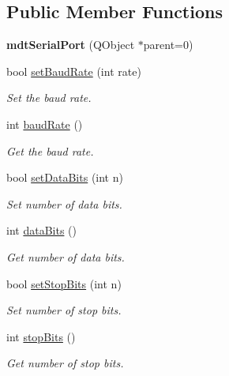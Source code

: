 \subsection*{Public Member Functions}
\begin{DoxyCompactItemize}
\item 
\hypertarget{classmdt_serial_port_a7b2da083885e727981c1fd4414634cae}{
{\bfseries mdtSerialPort} (QObject $\ast$parent=0)}
\label{classmdt_serial_port_a7b2da083885e727981c1fd4414634cae}

\item 
bool \hyperlink{classmdt_serial_port_ad77b6a5fd819fae6db0db888b3113351}{setBaudRate} (int rate)
\begin{DoxyCompactList}\small\item\em Set the baud rate. \end{DoxyCompactList}\item 
int \hyperlink{classmdt_serial_port_ab7d9433433f4ec5d5e584721e5bb1195}{baudRate} ()
\begin{DoxyCompactList}\small\item\em Get the baud rate. \end{DoxyCompactList}\item 
bool \hyperlink{classmdt_serial_port_af39774b2d3c4121623253740660a0389}{setDataBits} (int n)
\begin{DoxyCompactList}\small\item\em Set number of data bits. \end{DoxyCompactList}\item 
int \hyperlink{classmdt_serial_port_a65c92bdb5543c1fe0034169ffc88d09f}{dataBits} ()
\begin{DoxyCompactList}\small\item\em Get number of data bits. \end{DoxyCompactList}\item 
bool \hyperlink{classmdt_serial_port_a9471ebff90de41decee977566dd1571f}{setStopBits} (int n)
\begin{DoxyCompactList}\small\item\em Set number of stop bits. \end{DoxyCompactList}\item 
int \hyperlink{classmdt_serial_port_a163a83bdcac2c81a5c6b097c4afde41f}{stopBits} ()
\begin{DoxyCompactList}\small\item\em Get number of stop bits. \end{DoxyCompactList}\item 

\end{DoxyCompactItemize}

